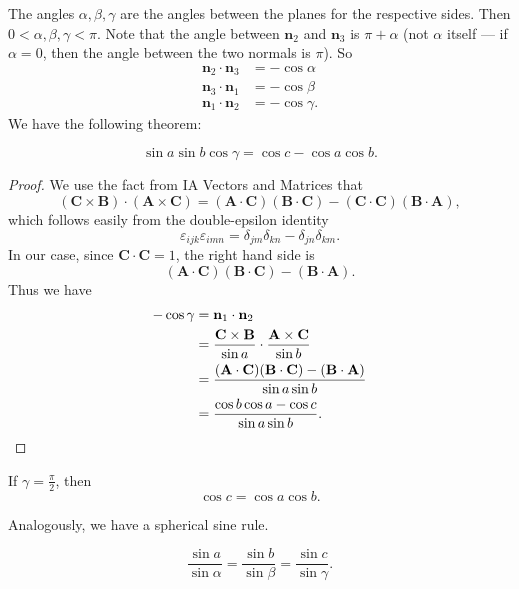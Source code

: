 \documentclass[a4paper]{article}
\begin{document}
The angles $\alpha, \beta, \gamma$ are the angles between the planes for the respective sides. Then $0 < \alpha, \beta, \gamma < \pi$. Note that the angle between $\mathbf{n}_2$ and $\mathbf{n}_3$ is $\pi + \alpha$ (not $\alpha$ itself --- if $\alpha = 0$, then the angle between the two normals is $\pi$). So
\begin{align*}
  \mathbf{n}_2 \cdot \mathbf{n}_3 &= -\cos \alpha\\
  \mathbf{n}_3 \cdot \mathbf{n}_1 &= -\cos \beta\\
  \mathbf{n}_1 \cdot \mathbf{n}_2 &= -\cos \gamma.
\end{align*}
We have the following theorem:
\begin{thm}
  \[
    \sin a \sin b \cos \gamma = \cos c - \cos a \cos b.
  \]
\end{thm}

\begin{proof}
  We use the fact from IA Vectors and Matrices that
  \[
    (\mathbf{C}\times \mathbf{B}) \cdot (\mathbf{A} \times \mathbf{C}) = (\mathbf{A}\cdot \mathbf{C})(\mathbf{B}\cdot \mathbf{C}) - (\mathbf{C} \cdot \mathbf{C})(\mathbf{B}\cdot \mathbf{A}),
  \]
  which follows easily from the double-epsilon identity
  \[
    \varepsilon_{ijk}\varepsilon_{imn} = \delta_{jm}\delta_{kn} - \delta_{jn}\delta_{km}.
  \]
  In our case, since $\mathbf{C}\cdot \mathbf{C} = 1$, the right hand side is
  \[
    (\mathbf{A}\cdot \mathbf{C}) (\mathbf{B}\cdot \mathbf{C}) - (\mathbf{B}\cdot \mathbf{A}).
  \]
  Thus we have
  \begin{align*}
    -\cos \gamma &= \mathbf{n}_1 \cdot \mathbf{n}_2\\
    &= \frac{\mathbf{C}\times \mathbf{B}}{\sin a} \cdot \frac{\mathbf{A}\times \mathbf{C}}{\sin b} \\
    &= \frac{(\mathbf{A}\cdot \mathbf{C})(\mathbf{B}\cdot \mathbf{C}) - (\mathbf{B}\cdot \mathbf{A})}{\sin a \sin b}\\
    &= \frac{\cos b\cos a - \cos c}{\sin a \sin b}.\qedhere
  \end{align*}
\end{proof}

\begin{cor}
  If $\gamma = \frac{\pi}{2}$, then
  \[
    \cos c = \cos a \cos b.
  \]
\end{cor}

Analogously, we have a spherical sine rule.
\begin{thm}
  \[
    \frac{\sin a}{\sin \alpha} = \frac{\sin b}{\sin \beta} = \frac{\sin c}{\sin \gamma}.
  \]
\end{thm}
\end{document}
